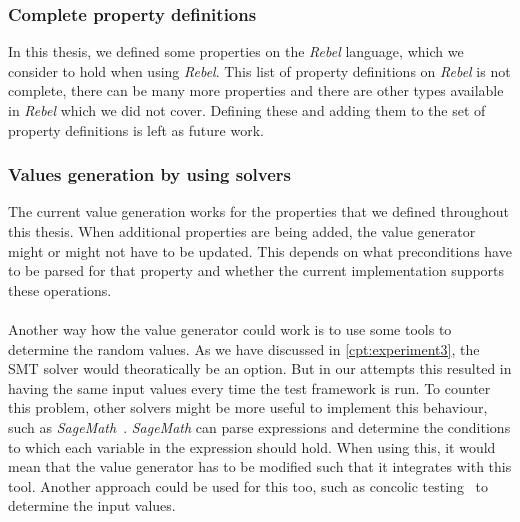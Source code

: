 \subsubsection{Complete property definitions}
In this thesis, we defined some properties on the \textit{Rebel} language,
which we consider to hold when using \textit{Rebel}. This list of property
definitions on \textit{Rebel} is not complete, there can be many more properties
and there are other types available in \textit{Rebel} which we did not cover.
Defining these and adding them to the set of property definitions is left as
future work.

\subsubsection{Values generation by using solvers}
The current value generation works for the properties that we defined throughout this thesis. When additional properties are being added, the value generator might or might not have to be updated. This depends on what preconditions have to be parsed for that property and whether the current implementation supports these operations.\\%
\\
Another way how the value generator could work is to use some tools to determine the random values. As we have discussed in \autoref{cpt:experiment3}, the SMT solver would theoratically be an option. But in our attempts this resulted in having the same input values every time the test framework is run. To counter this problem, other solvers might be more useful to implement this behaviour, such as \textit{SageMath}~\cite{siteSageMath2017}. \textit{SageMath} can parse expressions and determine the conditions to which each variable in the expression should hold. When using this, it would mean that the value generator has to be modified such that it integrates with this tool. Another approach could be used for this too, such as concolic testing~\cite{sen2006cute} to determine the input values. %

